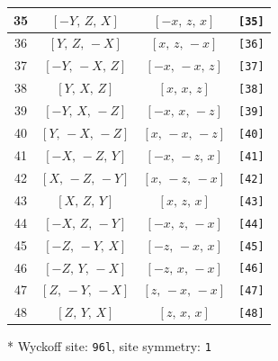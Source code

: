 \documentclass[fleqn,8pt]{jsarticle}
\begin{document}
\begin{longtable}{cccc}
35 & $\left[ - Y,\, Z,\, X \right]$ & $\left[ - x,\, z,\, x \right]$ & {\tt [35]} \\ \hline
36 & $\left[ Y,\, Z,\, - X \right]$ & $\left[ x,\, z,\, - x \right]$ & {\tt [36]} \\ \hline
37 & $\left[ - Y,\, - X,\, Z \right]$ & $\left[ - x,\, - x,\, z \right]$ & {\tt [37]} \\ \hline
38 & $\left[ Y,\, X,\, Z \right]$ & $\left[ x,\, x,\, z \right]$ & {\tt [38]} \\ \hline
39 & $\left[ - Y,\, X,\, - Z \right]$ & $\left[ - x,\, x,\, - z \right]$ & {\tt [39]} \\ \hline
40 & $\left[ Y,\, - X,\, - Z \right]$ & $\left[ x,\, - x,\, - z \right]$ & {\tt [40]} \\ \hline
41 & $\left[ - X,\, - Z,\, Y \right]$ & $\left[ - x,\, - z,\, x \right]$ & {\tt [41]} \\ \hline
42 & $\left[ X,\, - Z,\, - Y \right]$ & $\left[ x,\, - z,\, - x \right]$ & {\tt [42]} \\ \hline
43 & $\left[ X,\, Z,\, Y \right]$ & $\left[ x,\, z,\, x \right]$ & {\tt [43]} \\ \hline
44 & $\left[ - X,\, Z,\, - Y \right]$ & $\left[ - x,\, z,\, - x \right]$ & {\tt [44]} \\ \hline
45 & $\left[ - Z,\, - Y,\, X \right]$ & $\left[ - z,\, - x,\, x \right]$ & {\tt [45]} \\ \hline
46 & $\left[ - Z,\, Y,\, - X \right]$ & $\left[ - z,\, x,\, - x \right]$ & {\tt [46]} \\ \hline
47 & $\left[ Z,\, - Y,\, - X \right]$ & $\left[ z,\, - x,\, - x \right]$ & {\tt [47]} \\ \hline
48 & $\left[ Z,\, Y,\, X \right]$ & $\left[ z,\, x,\, x \right]$ & {\tt [48]} \\
\end{longtable}
* Wyckoff site: {\tt 96l}, site symmetry: {\tt 1}
\renewcommand{\arraystretch}{1.2}
\end{document}
